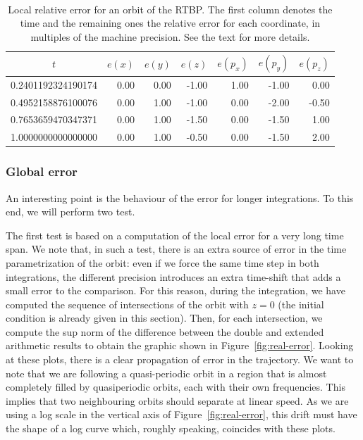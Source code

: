 \documentclass[12pt,twoside]{article}
\begin{document}
\begin{table}
\begin{center}
{\tt\small
\begin{tabular}{|r|r|r|r|r|r|r|}\hline
\multicolumn{1}{|c|}{$t$} & \multicolumn{1}{c|}{$e(x)$} &
\multicolumn{1}{c|}{$e(y)$} & \multicolumn{1}{c|}{$e(z)$} &
\multicolumn{1}{c|}{$e(p_x)$} & \multicolumn{1}{c|}{$e(p_y)$} &
\multicolumn{1}{c|}{$e(p_z)$} \\ \hline
0.2401192324190174 & 0.00 &\phantom{-}0.00 &-1.00 & 1.00 &-1.00 & 0.00\\
0.4952158876100076 & 0.00 & 1.00 &-1.00 &\phantom{-}0.00 &-2.00 &-0.50\\
0.7653659470347371 &\phantom{-}0.00 & 1.00 &-1.50 & 0.00 &-1.50 & 1.00\\
1.0000000000000000 & 0.00 & 1.00 &-0.50 & 0.00 &-1.50 & 2.00\\
\hline
\end{tabular}
}
\end{center}
\caption{Local relative error for an orbit of the RTBP. The first
column denotes the time and the remaining ones the relative error for
each coordinate, in multiples of the machine precision. See the text
for more details.}
\label{tau:local-error}
\end{table}

\subsubsection{Global error}\label{sec:globalerror}
An interesting point is the behaviour of the error for longer
integrations. To this end, we will perform two test.

The first test is based on a computation of the local error for a very
long time span. We note that, in such a test, there is an extra source
of error in the time parametrization of the orbit: even if we force
the same time step in both integrations, the different precision
introduces an extra time-shift that adds a small error to the
comparison. For this reason, during the integration, we have computed
the sequence of intersections of the orbit with $z=0$ (the
initial condition is already given in this section). Then, for each
intersection, we compute the sup norm of the difference between the
double and extended arithmetic results to obtain the graphic shown in
Figure~\ref{fig:real-error}. Looking at these plots, there is a clear
propagation of error in the trajectory. We want to note that we are
following a quasi-periodic orbit in a region that is almost completely
filled by quasiperiodic orbits, each with their own frequencies. This
implies that two neighbouring orbits should separate at linear speed.
As we are using a log scale in the vertical axis of
Figure~\ref{fig:real-error}, this drift must have the shape of a log
curve which, roughly speaking, coincides with these plots.
\end{document}
